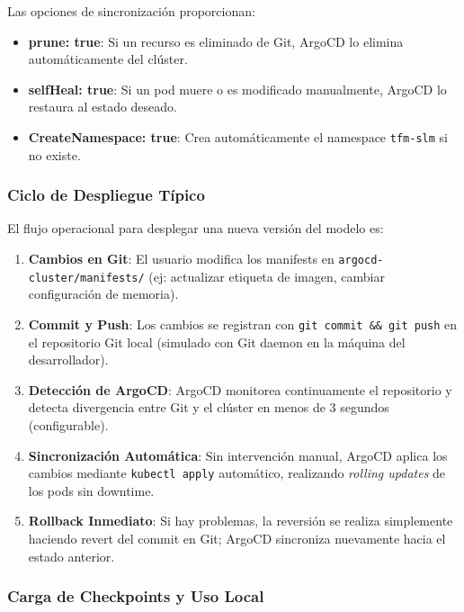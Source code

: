 Las opciones de sincronización proporcionan:

\begin{itemize}
    \item \textbf{prune: true}: Si un recurso es eliminado de Git, ArgoCD lo elimina automáticamente del clúster.
    \item \textbf{selfHeal: true}: Si un pod muere o es modificado manualmente, ArgoCD lo restaura al estado deseado.
    \item \textbf{CreateNamespace: true}: Crea automáticamente el namespace \texttt{tfm-slm} si no existe.
\end{itemize}

\subsubsection{Ciclo de Despliegue Típico}

El flujo operacional para desplegar una nueva versión del modelo es:

\begin{enumerate}
    \item \textbf{Cambios en Git}: El usuario modifica los manifests en \texttt{argocd-cluster/manifests/} (ej: actualizar etiqueta de imagen, cambiar configuración de memoria).

    \item \textbf{Commit y Push}: Los cambios se registran con \texttt{git commit \&\& git push} en el repositorio Git local (simulado con Git daemon en la máquina del desarrollador).

    \item \textbf{Detección de ArgoCD}: ArgoCD monitorea continuamente el repositorio y detecta divergencia entre Git y el clúster en menos de 3 segundos (configurable).

    \item \textbf{Sincronización Automática}: Sin intervención manual, ArgoCD aplica los cambios mediante \texttt{kubectl apply} automático, realizando \textit{rolling updates} de los pods sin downtime.

    \item \textbf{Rollback Inmediato}: Si hay problemas, la reversión se realiza simplemente haciendo revert del commit en Git; ArgoCD sincroniza nuevamente hacia el estado anterior.
\end{enumerate}

\subsubsection{Carga de Checkpoints y Uso Local}


